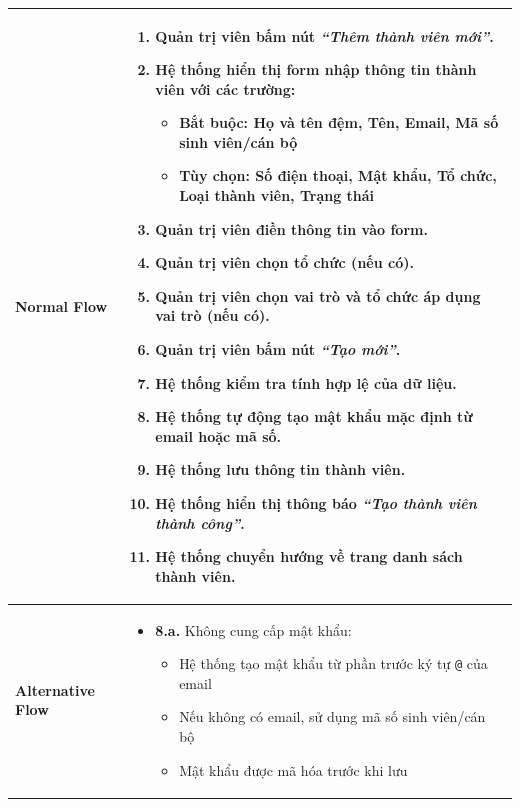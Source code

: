 \begin{table}[H]
\begin{tabular}{|m{}|m{}|}
\textbf{Normal Flow} 
&
\begin{enumerate}
    \item Quản trị viên bấm nút \textit{``Thêm thành viên mới''}.
    \item Hệ thống hiển thị form nhập thông tin thành viên với các trường:
    \begin{itemize}[label=--]
        \item \textbf{Bắt buộc}: Họ và tên đệm, Tên, Email, Mã số sinh viên/cán bộ
        \item \textbf{Tùy chọn}: Số điện thoại, Mật khẩu, Tổ chức, Loại thành viên, Trạng thái
    \end{itemize}
    \item Quản trị viên điền thông tin vào form.
    \item Quản trị viên chọn tổ chức (nếu có).
    \item Quản trị viên chọn vai trò và tổ chức áp dụng vai trò (nếu có).
    \item Quản trị viên bấm nút \textit{``Tạo mới''}.
    \item Hệ thống kiểm tra tính hợp lệ của dữ liệu.
    \item Hệ thống tự động tạo mật khẩu mặc định từ email hoặc mã số.
    \item Hệ thống lưu thông tin thành viên.
    \item Hệ thống hiển thị thông báo \textit{``Tạo thành viên thành công''}.
    \item Hệ thống chuyển hướng về trang danh sách thành viên.
\end{enumerate}
\\ 
\hline

\textbf{Alternative Flow} 
&
\begin{itemize}[label=--]
    \item \textbf{8.a.} Không cung cấp mật khẩu:
    \begin{itemize}[label=+]
        \item Hệ thống tạo mật khẩu từ phần trước ký tự \texttt{@} của email
        \item Nếu không có email, sử dụng mã số sinh viên/cán bộ
        \item Mật khẩu được mã hóa trước khi lưu
    \end{itemize}
\end{itemize}
\\ 
\hline


\end{tabular}
\end{table}
